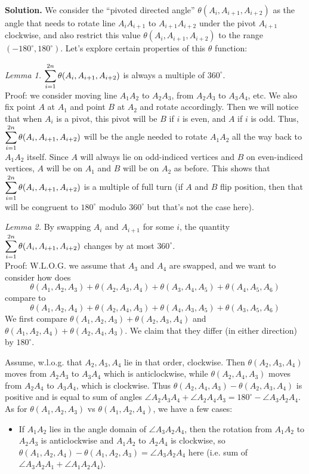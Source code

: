 \documentclass[11pt,a4paper]{article}
\begin{document}
\begin{enumerate}
	\textbf{Solution.} We consider the ``pivoted directed angle'' $\theta(A_i, A_{i+1}, A_{i+2})$ as the angle that needs to rotate line $A_iA_{i+1}$ to $A_{i+1}A_{i+2}$ under the pivot $A_{i+1}$ clockwise, and also restrict this value $\theta(A_i, A_{i+1}, A_{i+2})$ to the range $(-180^{\circ}, 180^{\circ})$. Let's explore certain properties of this $\theta$ function: 
	
	\emph{Lemma 1.} $\displaystyle\sum_{i=1}^{2n}\theta(A_i, A_{i+1}, A_{i+2})$ is always a multiple of $360^{\circ}$. \\
	Proof: we consider moving line $A_1A_2$ to $A_2A_3$, from $A_2A_3$ to $A_3A_4$, etc. 
	We also fix point $A$ at $A_1$ and point $B$ at $A_2$ and rotate accordingly. Then we will notice that when $A_i$ is a pivot, this pivot will be $B$ if $i$ is even, and $A$ if $i$ is odd. Thus, $\displaystyle\sum_{i=1}^{2n}\theta(A_i, A_{i+1}, A_{i+2})$ will be the angle needed to rotate $A_1A_2$ all the way back to $A_1A_2$ itself. Since $A$ will always lie on odd-indiced vertices and $B$ on even-indiced vertices, $A$ will be on $A_1$ and $B$ will be on $A_2$ as before. This shows that $\displaystyle\sum_{i=1}^{2n}\theta(A_i, A_{i+1}, A_{i+2})$ is a multiple of full turn (if $A$ and $B$ flip position, then that will be congruent to $180^{\circ}$ modulo $360^{\circ}$ but that's not the case here). 
	
	\emph{Lemma 2.} By swapping $A_i$ and $A_{i+1}$ for some $i$, the quantity $\displaystyle\sum_{i=1}^{2n}\theta(A_i, A_{i+1}, A_{i+2})$ changes by at most $360^{\circ}$. \\
	Proof: W.L.O.G. we assume that $A_3$ and $A_4$ are swapped, and we want to consider how does 
	\[
	\theta(A_1, A_2, A_3)+\theta(A_2, A_3, A_4)+\theta(A_3, A_4, A_5) + \theta (A_4, A_5, A_6)
	\]
	compare to 
	\[
	\theta(A_1, A_2, A_4)+\theta(A_2, A_4, A_3)+\theta(A_4, A_3, A_5) + \theta (A_3, A_5, A_6)
	\]
	We first compare $\theta(A_1, A_2, A_3)+\theta(A_2, A_3, A_4)$ and $\theta(A_1, A_2, A_4)+\theta(A_2, A_4, A_3)$. We claim that they differ (in either direction) by $180^{\circ}$. 
	
	Assume, w.l.o.g. that $A_2, A_3, A_4$ lie in that order, clockwise. Then $\theta(A_2, A_3, A_4)$ moves from $A_2A_3$ to $A_3A_4$ which is anticlockwise, while $\theta(A_2, A_4, A_3)$ moves from $A_2A_4$ to $A_3A_4$, which is clockwise. Thus $\theta(A_2, A_4, A_3)-\theta(A_2, A_3, A_4)$ is positive and is equal to sum of angles $\angle A_2A_3A_4+\angle A_2A_4A_3=180^{\circ} - \angle A_3A_2A_4$. 
	As for $\theta(A_1, A_2, A_3)$ vs $\theta(A_1, A_2, A_4)$, we have a few cases: 
	\begin{itemize}
		\item If $A_1A_2$ lies in the angle domain of $\angle A_3A_2A_4$, then the rotation from $A_1A_2$ to $A_2A_3$ is anticlockwise and $A_1A_2$ to $A_2A_4$ is clockwise, so $\theta(A_1, A_2, A_4)-\theta(A_1, A_2, A_3)=\angle A_3A_2A_4$ here (i.e. sum of $\angle A_3A_2A_1+\angle A_1A_2A_4$). 
		

\end{itemize}
\end{enumerate}
\end{document}
